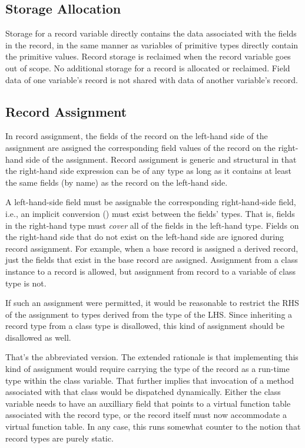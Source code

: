 \subsection{Storage Allocation}
\label{Record_Storage}

Storage for a record variable directly contains the data associated
with the fields in the record, in the same manner as variables
of primitive types directly contain the primitive values.
Record storage is reclaimed when the record variable goes out of scope.
No additional storage for a record is allocated or reclaimed.
Field data of one variable's record is not shared with data
of another variable's record.

\subsection{Record Assignment}
\label{Record_Assignment}

In record assignment, the fields of the record on the left-hand side
of the assignment are assigned the corresponding field values of the record
on the right-hand side of the assignment.
Record assignment is generic and structural in that the
right-hand side expression can be of any type as long as it
contains at least the same fields (by name) as the record on the left-hand
side.

A left-hand-side field must be assignable the corresponding
right-hand-side field, i.e., an implicit conversion
() must exist between the fields' types.  That is,
fields in the right-hand type must \emph{cover} all of the fields in the
left-hand type.
Fields on the right-hand side that do not exist on the left-hand side
are ignored during record assignment.  For example, when a base record is
assigned a derived record, just the fields that exist in the base
record are assigned.
Assignment from a class instance to a record is allowed, but assignment
from record to a variable of class type is not.

\begin{rationale}
If such an assignment were permitted, it would be reasonable to restrict the RHS
of the assignment to types derived from the type of the LHS.  Since inheriting a
record type from a class type is disallowed, this kind of assignment should be
disallowed as well.

That's the abbreviated version.  The extended rationale is that implementing
this kind of assignment would require carrying the type of the record as a
run-time type within the class variable.  That further implies that invocation
of a method associated with that class would be dispatched dynamically.  Either
the class variable needs to have an auxilliary field that points to a virtual
function table associated with the record type, or the record itself must now
accommodate a virtual function table.  In any case, this runs somewhat counter
to the notion that record types are purely static.
\end{rationale}

